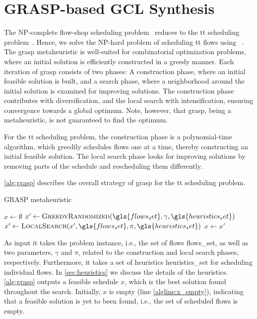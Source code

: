 \section{GRASP-based GCL Synthesis}
The NP-complete flow-shop scheduling problem~\cite{garey1976} reduces to the \gls{tt} scheduling problem~\cite{raagaardthesis}.
Hence, we solve the NP-hard problem of scheduling \gls{tt} flows using ~\cite{resende14}.
The \gls{grasp} metaheuristic is well-suited for combinatorial optimization problems, where an initial solution is efficiently constructed in a greedy manner.
Each iteration of \gls{grasp} consists of two phases: A construction phase, where an initial feasible solution is built, and a search phase, where a neighborhood around the initial solution is examined for improving solutions. The construction phase contributes with diversification, and the local search with intensification, ensuring convergence towards a global optimum. Note, however, that \gls{grasp}, being a metaheuristic, is not guaranteed to find the optimum.

For the \gls{tt} scheduling problem, the construction phase is a polynomial-time algorithm, which greedily schedules flows one at a time, thereby constructing an initial feasible solution. The local search phase looks for improving solutions by removing parts of the schedule and rescheduling them differently.

\autoref{alg:grasp} describes the overall strategy of \gls{grasp} for the \gls{tt} scheduling problem.
\begin{@empty}
\begin{algorithm}[b]
\small
\caption{GRASP metaheuristic} \label{alg:grasp}
	\begin{algorithmic}[1]
			\State $x \gets \emptyset$ \label{algline:x_empty}
			\Repeat
				\State $x' \gets \Call{GreedyRandomized}{\gls{flows_set}, \gamma, \gls{heuristics_set}}$ \label{algline:construction_phase}
				\State $x' \gets \Call{LocalSearch}{x', \gls{flows_set}, \pi, \gls{heuristics_set}}$ \label{algline:local_search_phase}
				 \label{algline:objective_comparison}
					\State $x \gets x'$ \label{algline:update_best}
				\EndIf
			 \label{algline:stop_criterion}
			\State {}
		\EndFunction
	\end{algorithmic}
\end{algorithm}
\end{@empty}
As input it takes the problem instance, i.e., the set of flows \gls{flows_set}, as well as two parameters, $\gamma$ and $\pi$, related to the construction and local search phases, respectively. Furthermore, it takes a set of heuristics \gls{heuristics_set} for scheduling individual flows. In \autoref{sec:heuristics} we discuss the details of the heuristics.
\autoref{alg:grasp} outputs a feasible schedule $x$, which is the best solution found throughout the search. Initially, $x$ is empty (line \ref{algline:x_empty}), indicating that a feasible solution is yet to been found, i.e., the set of scheduled flows is empty.

